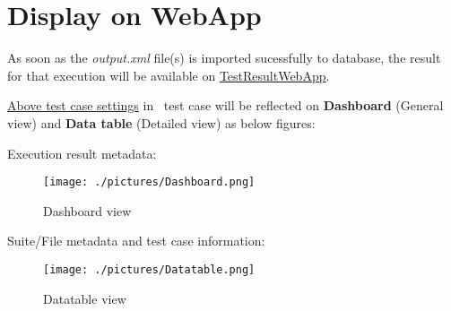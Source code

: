 \newpage
\hypertarget{description-display-on-webapp}{%
\section{Display on WebApp}\label{description-display-on-webapp}}

As soon as the \emph{output.xml} file(s) is imported sucessfully to database,
the result for that execution will be available on
\href{https://github.com/test-fullautomation/testresultwebapp}{TestResultWebApp}.

\hyperref[description-robotframework-testcase-settings]{Above test case settings}
in \rfwcore\ test case will be reflected on \textbf{Dashboard} (General view)
and \textbf{Data table} (Detailed view) as below figures:

Execution result metadata:

\begin{figure}[h!]
  \texttt{[image: ./pictures/Dashboard.png]}
  \caption{Dashboard view}
\end{figure}

Suite/File metadata and test case information:

\begin{figure}[h!]
  \texttt{[image: ./pictures/Datatable.png]}
  \caption{Datatable view}
\end{figure}
